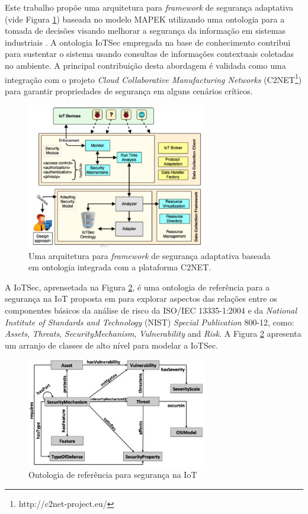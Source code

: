 \documentclass[tid,table]{texufpel} %
\begin{document}
Este trabalho propõe uma arquitetura para \textit{framework} de segurança adaptativa (vide Figura \ref{iotsec-architecture}) baseada no modelo MAPEK utilizando uma ontologia para a tomada de decisões visando melhorar a segurança da informação em sistemas industriais \cite{mozzaquatro16}. A ontologia IoTSec \cite{mozzaquatro15} empregada na base de conhecimento contribui para sustentar o sistema usando consultas de informações contextuais coletadas no ambiente. A principal contribuição desta abordagem é validada como uma integração com o projeto \textit{Cloud Collaborative Manufacturing Networks} (C2NET\footnote{http://c2net-project.eu/}) para garantir propriedades de segurança em alguns cenários críticos.

\begin{figure}[ht]
\centering
\includegraphics[width=0.7\textwidth]{imagens/iotsec-architecture.png}
\caption{Uma arquitetura para \textit{framework} de segurança adaptativa baseada em ontologia integrada com a plataforma C2NET.}
\label{iotsec-architecture}
\end{figure}

A IoTSec, aprensetada na Figura \ref{iotsec-ontology}, é uma ontologia de referência para a segurança na IoT proposta em \cite{mozzaquatro15} para explorar aspectos das relações entre os componentes básicos da análise de risco da ISO/IEC 13335-1:2004 e da \textit{National Institute of Standards and Technology} (NIST) \textit{Special Publication} 800-12, como: \textit{Assets}, \textit{Threats}, \textit{SecurityMechanism}, \textit{Vulnerability} and \textit{Risk}. A Figura \ref{iotsec-ontology} apresenta um arranjo de classes de alto nível para modelar a IoTSec.

\begin{figure}[ht]
\centering
\includegraphics[width=0.7\textwidth]{imagens/iotsec-ontology.png}
\caption{Ontologia de referência para segurança na IoT \cite{mozzaquatro15}}
\label{iotsec-ontology}
\end{figure}
\end{document}
